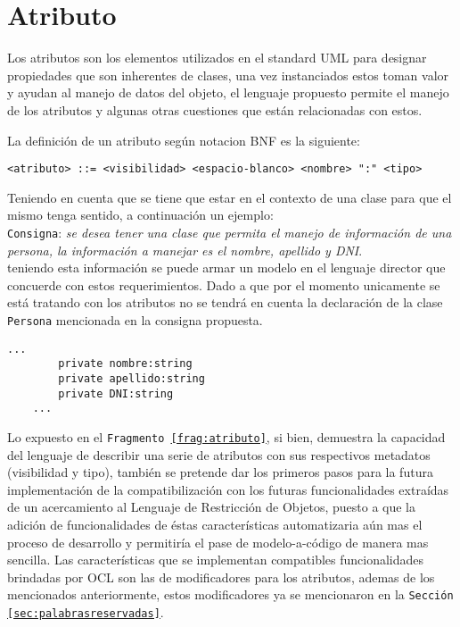 \section{Atributo}
\label{sec:atributo}

Los atributos son los elementos utilizados en el standard UML para designar
propiedades que son inherentes de clases, una vez instanciados estos toman
valor y ayudan al manejo de datos del objeto, el lenguaje propuesto permite el
manejo de los atributos y algunas otras cuestiones que están relacionadas con
estos.

La definición de un atributo según notacion BNF es la siguiente:

\begin{lstlisting}[basicstyle=\footnotesize\ttfamily]
  <atributo> ::= <visibilidad> <espacio-blanco> <nombre> ":" <tipo>
\end{lstlisting}

Teniendo en cuenta que se tiene que estar en el contexto de una clase para que
el mismo tenga sentido, a continuación un ejemplo:\\

\texttt{Consigna}: \textit{se desea tener una clase que permita el manejo de
información de una persona, la información a manejar es el nombre, apellido y
DNI}.\\

teniendo esta información se puede armar un modelo en el lenguaje director que
concuerde con estos requerimientos. Dado a que por el momento unicamente se
está tratando con los atributos no se tendrá en cuenta la declaración de la
clase \texttt{Persona} mencionada en la consigna propuesta.

\begin{lstlisting}[label=frag:atributo]
  ...
		private nombre:string
		private apellido:string
		private DNI:string
	...
\end{lstlisting}

Lo expuesto en el \texttt{Fragmento \ref{frag:atributo}}, si bien, demuestra
la capacidad del lenguaje de describir una serie de atributos con sus
respectivos metadatos (visibilidad y tipo), también se pretende dar los
primeros pasos para la futura implementación de la compatibilización con los
futuras funcionalidades extraídas de un acercamiento al Lenguaje de
Restricción de Objetos, puesto a que la adición de funcionalidades de éstas
características automatizaria aún mas el proceso de
desarrollo y permitiría el pase de modelo-a-código de manera mas sencilla.
Las características que se implementan compatibles funcionalidades brindadas
por OCL son las de modificadores para los atributos, ademas de los mencionados
anteriormente, estos modificadores ya se mencionaron en la \texttt{Sección
\ref{sec:palabrasreservadas}}.

